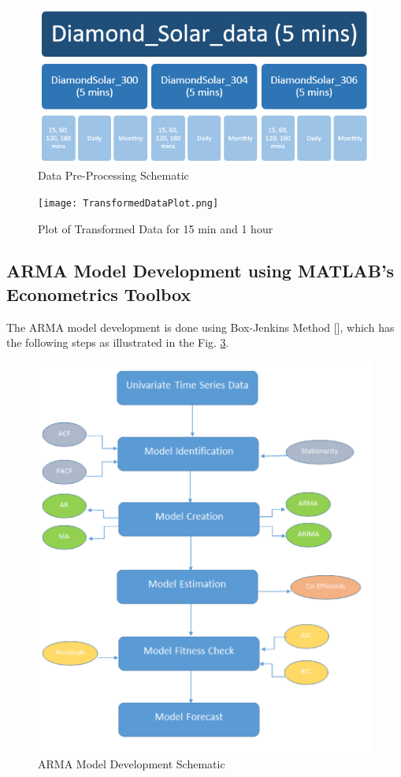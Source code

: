 \documentclass[journal]{IEEEtran}
\begin{document}
\begin{figure}[H]
\centering
\includegraphics[scale=0.65]{DataTransformationSchematic.png}
\caption{Data Pre-Processing Schematic}
\label{fig2} %
\end{figure}

\begin{figure}[H]
	\centering
	\texttt{[image: TransformedDataPlot.png]}
	\caption{Plot of Transformed Data for 15 min and 1 hour}
	\label{fig3} %
\end{figure}

\subsection{ARMA Model Development using MATLAB’s Econometrics Toolbox}

The ARMA model development is done using Box-Jenkins Method [], which has the following steps as illustrated in the Fig. \ref{fig4}.


\begin{figure}[H]
\centering
\includegraphics[scale=0.75]{ARMASteps.png}
\caption{ARMA Model Development Schematic}
\label{fig4} %
\end{figure}
\end{document}
